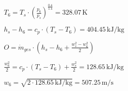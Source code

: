 \( T_6 = T_s \cdot \left( \frac{p_6}{p_s} \right)^{\frac{0.4}{1.4}} = 328.07 \, \text{K} \)  

\( h_s - h_6 = c_p \cdot (T_s - T_6) = 404.45 \, \text{kJ/kg} \)  

\( O = \dot{m}_{ges} \cdot \left( h_s - h_6 + \frac{w_s^2 - w_6^2}{2} \right) \)  

\( \frac{w_6^2}{2} = c_p \cdot (T_s - T_6) + \frac{w_s^2}{2} = 128.65 \, \text{kJ/kg} \)  

\( w_6 = \sqrt{2 \cdot 128.65 \, \text{kJ/kg}} = 507.25 \, \text{m/s} \)